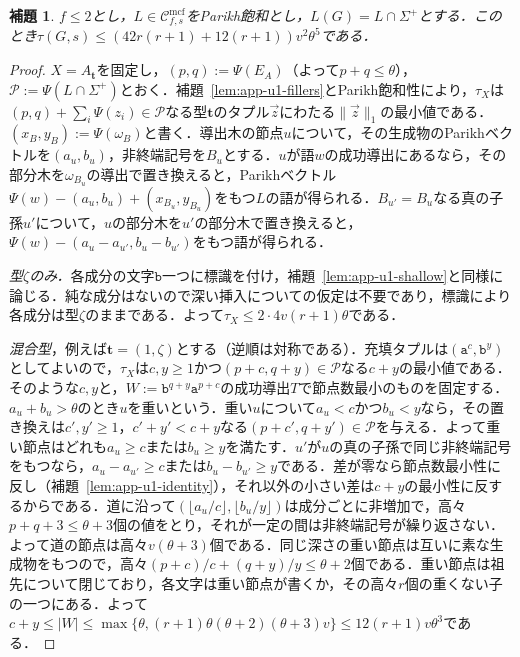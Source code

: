 \documentclass[11pt,a4paper]{ltjsarticle}
\numberwithin{equation}{section}
\theoremstyle{plain}
\newtheorem{lemma}[theorem]{補題}
\theoremstyle{definition}
\theoremstyle{remark}
\newcommand{\Cmcf}[2]{\mathcal{C}^{\mathrm{mcf}}_{#1,#2}}
\newcommand{\tuple}[1]{\vec{#1}}
\begin{document}
\begin{lemma}\label{lem:app-u1-parikh}
$f\le2$とし，$L\in\Cmcf{f}{s}$をParikh飽和とし，$L(G)=L\cap\Sigma^+$とする．このとき$\tau(G,s)\le(42r(r+1)+12(r+1))v^2\theta^5$である．
\end{lemma}

\begin{proof}
$X=A_{\mathbf t}$を固定し，$(p,q):=\Psi(E_A)$（よって$p+q\le\theta$），$\mathcal P:=\Psi(L\cap\Sigma^+)$とおく．補題~\ref{lem:app-u1-fillers}とParikh飽和性により，$\tau_X$は$(p,q)+\sum_i\Psi(z_i)\in\mathcal P$なる型$\mathbf t$のタプル$\tuple z$にわたる$\|\tuple z\|_1$の最小値である．$(x_B,y_B):=\Psi(\omega_B)$と書く．導出木の節点$u$について，その生成物のParikhベクトルを$(a_u,b_u)$，非終端記号を$B_u$とする．$u$が語$w$の成功導出にあるなら，その部分木を$\omega_{B_u}$の導出で置き換えると，Parikhベクトル$\Psi(w)-(a_u,b_u)+(x_{B_u},y_{B_u})$をもつ$L$の語が得られる．$B_{u'}=B_u$なる真の子孫$u'$について，$u$の部分木を$u'$の部分木で置き換えると，$\Psi(w)-(a_u-a_{u'},b_u-b_{u'})$をもつ語が得られる．

\emph{型$\zeta$のみ．}各成分の文字$\mathtt b$一つに標識を付け，補題~\ref{lem:app-u1-shallow}と同様に論じる．純な成分はないので深い挿入についての仮定は不要であり，標識により各成分は型$\zeta$のままである．よって$\tau_X\le2\cdot4v(r+1)\theta$である．

\emph{混合型}，例えば$\mathbf t=(1,\zeta)$とする（逆順は対称である）．充填タプルは$(\mathtt a^c,\mathtt b^y)$としてよいので，$\tau_X$は$c,y\ge1$かつ$(p+c,q+y)\in\mathcal P$なる$c+y$の最小値である．そのような$c,y$と，$W:=\mathtt b^{q+y}\mathtt a^{p+c}$の成功導出$T$で節点数最小のものを固定する．$a_u+b_u>\theta$のとき$u$を重いという．重い$u$について$a_u<c$かつ$b_u<y$なら，その置き換えは$c',y'\ge1$，$c'+y'<c+y$なる$(p+c',q+y')\in\mathcal P$を与える．よって重い節点はどれも$a_u\ge c$または$b_u\ge y$を満たす．$u'$が$u$の真の子孫で同じ非終端記号をもつなら，$a_u-a_{u'}\ge c$または$b_u-b_{u'}\ge y$である．差が零なら節点数最小性に反し（補題~\ref{lem:app-u1-identity}），それ以外の小さい差は$c+y$の最小性に反するからである．道に沿って$(\lfloor a_u/c\rfloor,\lfloor b_u/y\rfloor)$は成分ごとに非増加で，高々$p+q+3\le\theta+3$個の値をとり，それが一定の間は非終端記号が繰り返さない．よって道の節点は高々$v(\theta+3)$個である．同じ深さの重い節点は互いに素な生成物をもつので，高々$(p+c)/c+(q+y)/y\le\theta+2$個である．重い節点は祖先について閉じており，各文字は重い節点が書くか，その高々$r$個の重くない子の一つにある．よって
$c+y\le|W|\le\max\{\theta,(r+1)\theta(\theta+2)(\theta+3)v\}\le12(r+1)v\theta^3$である．


\end{proof}
\end{document}
